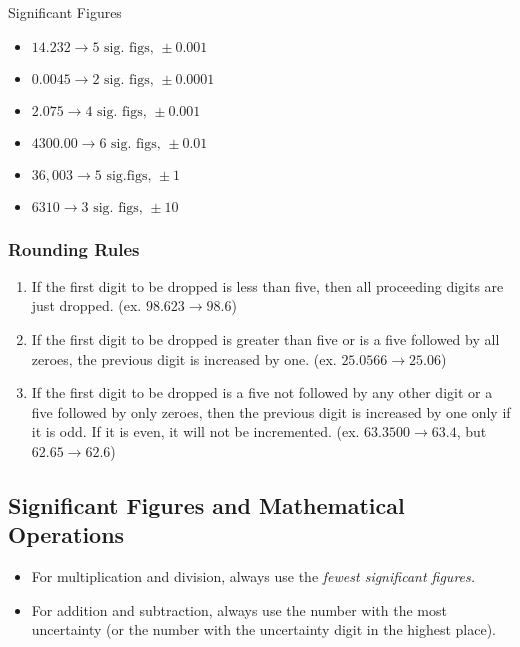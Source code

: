 
\begin{example}
Significant Figures
\begin{itemize}
	\item $14.232 \rightarrow 5 \text{ sig. figs, } \pm 0.001$
	\item $0.0045 \rightarrow 2 \text{ sig. figs, } \pm 0.0001$
	\item $2.075 \rightarrow 4 \text{ sig. figs, } \pm 0.001$
	\item $4300.00 \rightarrow 6 \text{ sig. figs, } \pm 0.01$
	\item $36,003 \rightarrow 5 \text{ sig.figs, } \pm 1$
	\item $6310 \rightarrow 3 \text{ sig. figs, } \pm 10$
\end{itemize}
\end{example}

\subsubsection{Rounding Rules}

\begin{enumerate}
	\item If the first digit to be dropped is less than five, then all proceeding digits are just dropped. (ex. $98.623 \rightarrow 98.6$)
	\item If the first digit to be dropped is greater than five or is a five followed by all zeroes, the previous digit is increased by one. (ex. $25.0566 \rightarrow 25.06$)
	\item If the first digit to be dropped is a five not followed by any other digit or a five followed by only zeroes, then the previous digit is increased by one only if it is odd. If it is even, it will not be incremented. (ex. $63.3500 \rightarrow 63.4$, but $62.65 \rightarrow 62.6$)
\end{enumerate}

\subsection{Significant Figures and Mathematical Operations}

\begin{itemize}
	\item For multiplication and division, always use the \textit{fewest significant figures.}
	\item For addition and subtraction, always use the number with the most uncertainty (or the number with the uncertainty digit in the highest place).
\end{itemize}

